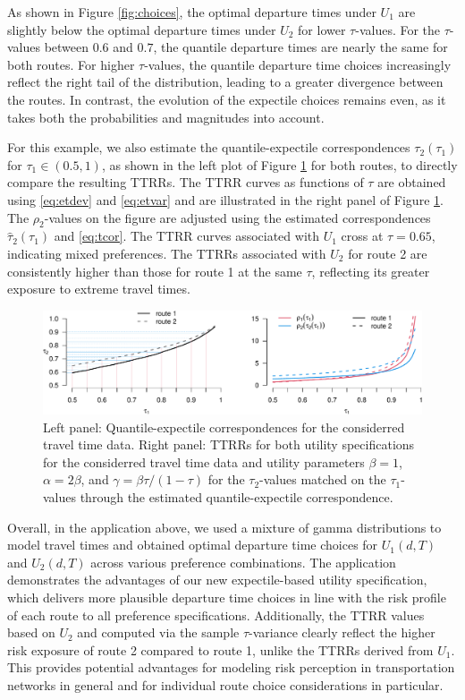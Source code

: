 \documentclass[preprint, 3p, authoryear]{elsarticle} %
\theoremstyle{definition}
\theoremstyle{definition}
\theoremstyle{definition}
\theoremstyle{definition}
\theoremstyle{remark}
\begin{document}
As shown in Figure \ref{fig:choices}, the optimal departure times under \(U_1\) are slightly below the optimal departure times under \(U_2\) for lower \(\tau\)-values. For the \(\tau\)-values between \(0.6\) and \(0.7\), the quantile departure times are nearly the same for both routes. For higher \(\tau\)-values, the quantile departure time choices increasingly reflect the right tail of the distribution, leading to a greater divergence between the routes. In contrast, the evolution of the expectile choices remains even, as it takes both the probabilities and magnitudes into account.

For this example, we also estimate the quantile-expectile correspondences \(\tau_2(\tau_1)\) for \(\tau_1\in(0.5,1)\), as shown in the left plot of Figure \ref{fig:figcor2} for both routes, to directly compare the resulting TTRRs. The TTRR curves as functions of \(\tau\) are obtained using \eqref{eq:etdev} and \eqref{eq:etvar} and are illustrated in the right panel of Figure \ref{fig:figcor2}. The \(\rho_2\)-values on the figure are adjusted using the estimated correspondences \(\hat\tau_2(\tau_1)\) and \eqref{eq:tcor}. The TTRR curves associated with \(U_1\) cross at \(\tau=0.65\), indicating mixed preferences. The TTRRs associated with \(U_2\) for route 2 are consistently higher than those for route 1 at the same \(\tau\), reflecting its greater exposure to extreme travel times.

\begin{figure}
\includegraphics[width=1\linewidth]{traffic-expectiles_files/figure-latex/figcor2-1} \caption{Left panel: Quantile-expectile correspondences for the considerred travel time data. Right panel: TTRRs for both utility specifications for the considerred travel time data and utility parameters $\beta=1$, $\alpha=2\beta$, and $\gamma = \beta\tau/(1-\tau)$ for the $\tau_2$-values matched on the $\tau_1$-values through the estimated quantile-expectile correspondence.}\label{fig:figcor2}
\end{figure}

Overall, in the application above, we used a mixture of gamma distributions to model travel times and obtained optimal departure time choices for \(U_1(d,T)\) and \(U_2(d,T)\) across various preference combinations. The application demonstrates the advantages of our new expectile-based utility specification, which delivers more plausible departure time choices in line with the risk profile of each route to all preference specifications. Additionally, the TTRR values based on \(U_2\) and computed via the sample \(\tau\)-variance clearly reflect the higher risk exposure of route 2 compared to route 1, unlike the TTRRs derived from \(U_1\). This provides potential advantages for modeling risk perception in transportation networks in general and for individual route choice considerations in particular.
\end{document}
